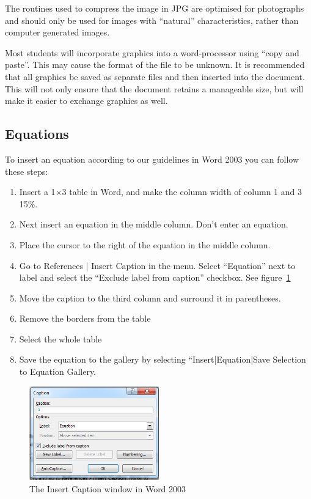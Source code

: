 \documentclass[a5paper, 10pt]{article}
\begin{document}
The routines used to compress the image in JPG are optimised for photographs and should only be used for images with ``natural''
characteristics, rather than computer generated images.

Most students will incorporate graphics into a word-processor using ``copy and paste''.
This may cause the format of the file to be unknown.
It is recommended that all graphics be saved as separate files and then inserted into the document.
This will not only ensure that the document retains a manageable size, but will make it easier to exchange graphics as well.

\subsection{Equations}
\label{sec:tips-equations}
To insert an equation according to our guidelines in Word 2003 you can follow these steps:
\begin{enumerate}
\item Insert a 1$\times$3 table in Word, and make the column width of column 1 and 3 15\%.
\item Next insert an equation in the middle column. Don't enter an equation.
\item Place the cursor to the right of the equation in the middle column.
\item Go to References | Insert Caption in the menu. Select ``Equation'' next to label and select the ``Exclude label from caption'' checkbox. See figure~\ref{fig:wordcaption}
\item Move the caption to the third column and surround it in parentheses.
\item Remove the borders from the table
\item Select the whole table
\item Save the equation to the gallery by selecting ``Insert|Equation|Save Selection to Equation Gallery.
\end{enumerate}
\begin{figure}[htbp]
  \centering
  \includegraphics[width=0.5\textwidth]{captionwindow}
  \caption{The Insert Caption window in Word 2003}
  \label{fig:wordcaption}
\end{figure}
\end{document}
